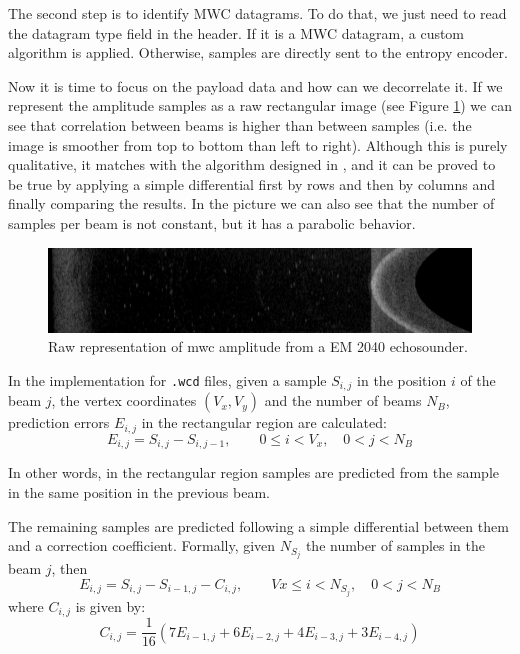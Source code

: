 The second step is to identify MWC datagrams. To do that, we just need to read the datagram type field in the header. If it is a MWC datagram, a custom algorithm is applied. Otherwise, samples are directly sent to the entropy encoder.

Now it is time to focus on the payload data and how can we decorrelate it. If we represent the amplitude samples as a raw rectangular image (see Figure \ref{fig:wc_amplitude}) we can see that correlation between beams is higher than between samples (i.e. the image is smoother from top to bottom than left to right). Although this is purely qualitative, it matches with the algorithm designed in \parencite{Portell2019}, and it can be proved to be true by applying a simple differential first by rows and then by columns and finally comparing the results. In the picture we can also see that the number of samples per beam is not constant, but it has a parabolic behavior.
\begin{figure}[h!]
	\begin{center}
		\includegraphics[scale=0.334]{images/water_column_amp.png}
	\end{center}
	\caption{Raw representation of \acrshort{mwc} amplitude from a EM 2040 echosounder.}
	\label{fig:wc_amplitude}
\end{figure}

In the implementation for \texttt{.wcd} files, given a sample $S_{i,j}$ in the position $i$ of the beam $j$, the vertex coordinates $(V_x, V_y)$ and the number of beams $N_B$, prediction errors $E_{i,j}$ in the rectangular region are calculated:
\begin{equation}
E_{i,j} = S_{i,j} - S_{i,j-1}, \qquad 0 \leq i < V_x, \quad 0 < j < N_B
\end{equation}

In other words, in the rectangular region samples are predicted from the sample in the same position in the previous beam.

The remaining samples are predicted following a simple differential between them and a correction coefficient. Formally, given $N_{S_j}$ the number of samples in the beam $j$, then
\begin{equation}
E_{i,j} = S_{i,j} - S_{i-1,j} - C_{i,j}, \qquad Vx \leq i < N_{S_j}, \quad 0 < j < N_B
\end{equation}
where $C_{i,j}$ is given by:
\begin{equation}
C_{i,j} = \frac{1}{16}(7E_{i-1,j} + 6E_{i-2,j} + 4E_{i-3,j} + 3E_{i-4,j})
\end{equation}

